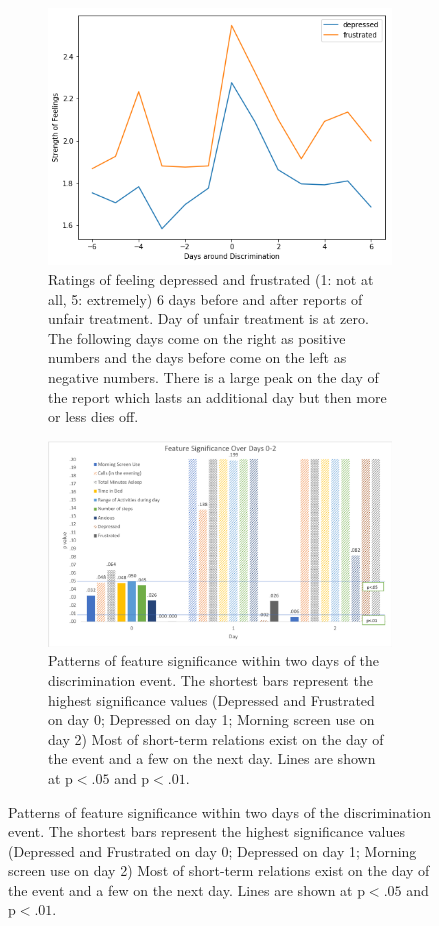 \begin{figure}
     \centering

\begin{subfigure}[t]{0.49\textwidth}
    \centering
    \includegraphics[width=\textwidth]{img/affect-beforeafter.png}
    \caption[Affect ratings before and after unfair treatment]{Ratings of feeling depressed and frustrated (1: not at all, 5: extremely) 6 days before and after reports of unfair treatment. Day of unfair treatment is at zero. The following days come on the right as positive numbers and the days before come on the left as negative numbers. There is a large peak on the day of the report which lasts an additional day but then more or less dies off.
    }
    \label{fig:reeults-affect-dieoff}
\end{subfigure}
\hfill
\begin{subfigure}[t]{0.49\textwidth}
    \centering
    \includegraphics[width=\textwidth]{img/feature-significance}
    \caption[Feature significance over time]{Patterns of feature significance within two days of the discrimination event. The shortest bars represent the highest significance values (\eg Depressed and Frustrated on day 0; Depressed on day 1; Morning screen use on day 2) Most of short-term relations exist on the day of the event and a few on the next day.  Lines are shown at p$<.05$ and p$<.01$.\\ }
    \label{fig:die-off}
\end{subfigure}

\end{figure}


